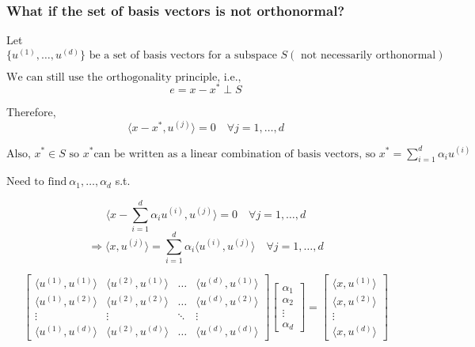     \subsubsection{What if the set of basis vectors is not orthonormal?}
    \begin{intuition}
        Let $\{u^{(1)}, \dots, u^{(d)}\} \text{ be a set of basis vectors for a subspace } S (\text{ not necessarily orthonormal})$
        \vspace{1em}

        $\text{We can still use the orthogonality principle, i.e.,}$
        \[
        e = x - x^* \perp S
        \]
        \vspace{1em}

        Therefore, 
        \[
        \langle x - x^*, u^{(j)} \rangle = 0 \quad \forall j = 1, \dots, d 
        \]
        
        $\text{Also, } x^* \in S \text{ so } x^* \text{can be written as a linear combination of basis vectors, so } x^* = \sum_{i=1}^{d} \alpha_i u^{(i)}$
        \vspace{1em}
        
        $\text{Need to find} \ \alpha_1, \dots, \alpha_d$ s.t.

        \[
        \langle x - \sum_{i=1}^{d} \alpha_i u^{(i)}, u^{(j)} \rangle = 0 \quad \forall j = 1, \dots, d
        \]
        \[
        \Rightarrow \langle x, u^{(j)} \rangle = \sum_{i=1}^{d} \alpha_i \langle u^{(i)}, u^{(j)} \rangle \quad \forall j = 1, \dots, d
        \]

        \[
        \begin{bmatrix}
        \langle u^{(1)}, u^{(1)} \rangle & \langle u^{(2)}, u^{(1)} \rangle & \dots & \langle u^{(d)}, u^{(1)} \rangle \\
        \langle u^{(1)}, u^{(2)} \rangle & \langle u^{(2)}, u^{(2)} \rangle & \dots & \langle u^{(d)}, u^{(2)} \rangle \\
        \vdots & \vdots & \ddots & \vdots \\
        \langle u^{(1)}, u^{(d)} \rangle & \langle u^{(2)}, u^{(d)} \rangle & \dots & \langle u^{(d)}, u^{(d)} \rangle
        \end{bmatrix}
        \begin{bmatrix}
        \alpha_1 \\
        \alpha_2 \\
        \vdots \\
        \alpha_d
        \end{bmatrix}
        =
        \begin{bmatrix}
        \langle x, u^{(1)} \rangle \\
        \langle x, u^{(2)} \rangle \\
        \vdots \\
        \langle x, u^{(d)} \rangle
        \end{bmatrix}
        \]


\end{intuition}
